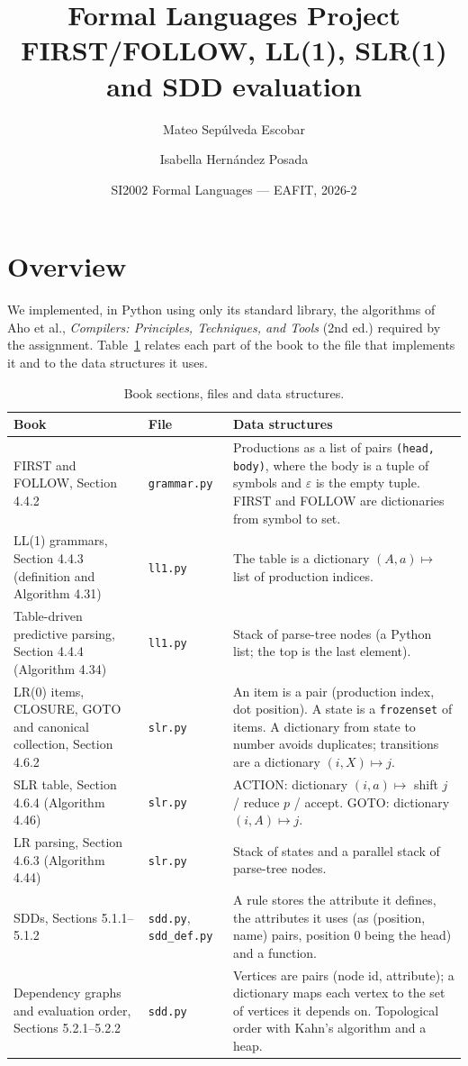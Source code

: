 \documentclass[11pt]{article}
\title{Formal Languages Project\\FIRST/FOLLOW, LL(1), SLR(1) and SDD evaluation}
\author{Mateo Sepúlveda Escobar \and Isabella Hernández Posada}
\date{SI2002 Formal Languages --- EAFIT, 2026-2}
\begin{document}
\maketitle

\section{Overview}

We implemented, in Python using only its standard library, the algorithms of
Aho et al., \emph{Compilers: Principles, Techniques, and Tools} (2nd ed.)
required by the assignment. Table~\ref{tab:map} relates each part of the book
to the file that implements it and to the data structures it uses.

\begin{table}[h]
\centering\small
\begin{tabular}{p{4.6cm}p{2.2cm}p{8.2cm}}
\toprule
Book & File & Data structures \\
\midrule
FIRST and FOLLOW, Section 4.4.2 &
\texttt{grammar.py} &
Productions as a list of pairs \texttt{(head, body)}, where the body is a tuple of
symbols and $\varepsilon$ is the empty tuple. FIRST and FOLLOW are dictionaries
from symbol to set. \\
LL(1) grammars, Section 4.4.3 (definition and Algorithm 4.31) &
\texttt{ll1.py} &
The table is a dictionary $(A, a) \mapsto$ list of production indices. \\
Table-driven predictive parsing, Section 4.4.4 (Algorithm 4.34) &
\texttt{ll1.py} &
Stack of parse-tree nodes (a Python list; the top is the last element). \\
LR(0) items, CLOSURE, GOTO and canonical collection, Section 4.6.2 &
\texttt{slr.py} &
An item is a pair (production index, dot position). A state is a
\texttt{frozenset} of items. A dictionary from state to number avoids duplicates;
transitions are a dictionary $(i, X) \mapsto j$. \\
SLR table, Section 4.6.4 (Algorithm 4.46) &
\texttt{slr.py} &
ACTION: dictionary $(i, a) \mapsto$ shift $j$ / reduce $p$ / accept.
GOTO: dictionary $(i, A) \mapsto j$. \\
LR parsing, Section 4.6.3 (Algorithm 4.44) &
\texttt{slr.py} &
Stack of states and a parallel stack of parse-tree nodes. \\
SDDs, Sections 5.1.1--5.1.2 &
\texttt{sdd.py}, \texttt{sdd\_def.py} &
A rule stores the attribute it defines, the attributes it uses (as
(position, name) pairs, position 0 being the head) and a function. \\
Dependency graphs and evaluation order, Sections 5.2.1--5.2.2 &
\texttt{sdd.py} &
Vertices are pairs (node id, attribute); a dictionary maps each vertex to the set
of vertices it depends on. Topological order with Kahn's algorithm and a heap. \\
\bottomrule
\end{tabular}
\caption{Book sections, files and data structures.}
\label{tab:map}
\end{table}
\end{document}
